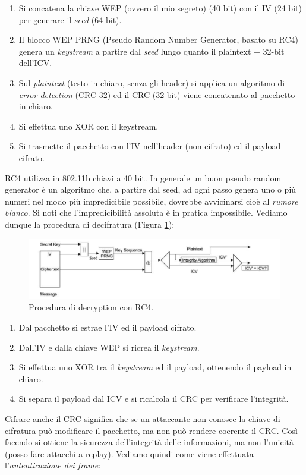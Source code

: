 \begin{enumerate}
	\item Si concatena la chiave WEP (ovvero il mio segreto) (40 bit) con il IV (24 bit) per generare il \textit{seed} (64 bit).
	\item Il blocco WEP PRNG (Pseudo Random Number Generator, basato su RC4) genera un \textit{keystream} a partire dal \textit{seed} lungo quanto il plaintext + 32-bit dell'ICV.
	\item Sul \textit{plaintext} (testo in chiaro, senza gli header) si applica un algoritmo di \textit{error detection} (CRC-32) ed il CRC (32 bit) viene concatenato al pacchetto in chiaro.
	\item Si effettua uno XOR con il keystream.
	\item Si trasmette il pacchetto con l'IV nell'header (non cifrato) ed il payload cifrato.
\end{enumerate}
RC4 utilizza in 802.11b chiavi a 40 bit. In generale un buon pseudo random generator è un algoritmo che, a partire dal seed, ad ogni passo genera uno o più numeri nel modo più impredicibile possibile, dovrebbe avvicinarsi cioè al \textit{rumore bianco}. Si noti che l'impredicibilità assoluta è in pratica impossibile. Vediamo dunque la procedura di decifratura (Figura \ref{img:RC4-decryption}):
\begin{figure}[htbp]
	\centering
	\includegraphics[scale = 0.5]{images/RC4-decryption}
	\caption{Procedura di decryption con RC4.}
	\label{img:RC4-decryption}
\end{figure}
\begin{enumerate}
	\item Dal pacchetto si estrae l'IV ed il payload cifrato.
	\item Dall'IV e dalla chiave WEP si ricrea il \textit{keystream}.
	\item Si effettua uno XOR tra il \textit{keystream} ed il payload, ottenendo il payload in chiaro.
	\item Si separa il payload dal ICV e si ricalcola il CRC per verificare l'integrità.
\end{enumerate}
Cifrare anche il CRC significa che se un attaccante non conosce la chiave di cifratura può modificare il pacchetto, ma non può rendere coerente il CRC. Così facendo si ottiene la sicurezza dell'integrità delle informazioni, ma non l'unicità (posso fare attacchi a replay). Vediamo quindi come viene effettuata l'\textit{autenticazione dei frame}:
